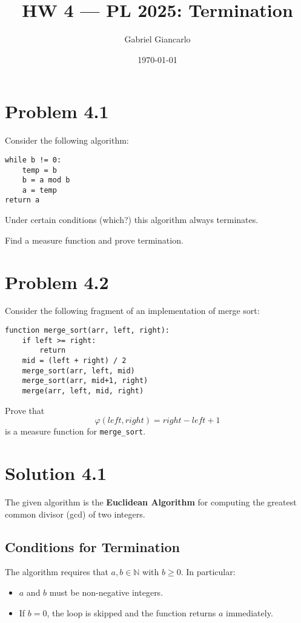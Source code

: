 \documentclass[12pt]{article}
\title{HW 4 --- PL 2025: Termination}
\author{Gabriel Giancarlo}
\date{\today}
\begin{document}
\maketitle

\section*{Problem 4.1}

Consider the following algorithm:

\begin{verbatim}
while b != 0:
    temp = b
    b = a mod b
    a = temp
return a
\end{verbatim}

Under certain conditions (which?) this algorithm always terminates.  

Find a measure function and prove termination.

\bigskip

\section*{Problem 4.2}

Consider the following fragment of an implementation of merge sort:

\begin{verbatim}
function merge_sort(arr, left, right):
    if left >= right:
        return
    mid = (left + right) / 2
    merge_sort(arr, left, mid)
    merge_sort(arr, mid+1, right)
    merge(arr, left, mid, right)
\end{verbatim}

Prove that
\[
    \varphi(left, right) = right - left + 1
\]
is a measure function for \texttt{merge\_sort}.

\newpage

\section*{Solution 4.1}

The given algorithm is the \textbf{Euclidean Algorithm} for computing the greatest common divisor (gcd) of two integers.

\subsection*{Conditions for Termination}
The algorithm requires that $a, b \in \mathbb{N}$ with $b \geq 0$. In particular:
\begin{itemize}
    \item $a$ and $b$ must be non-negative integers.
    \item If $b = 0$, the loop is skipped and the function returns $a$ immediately.
\end{itemize}
\end{document}
